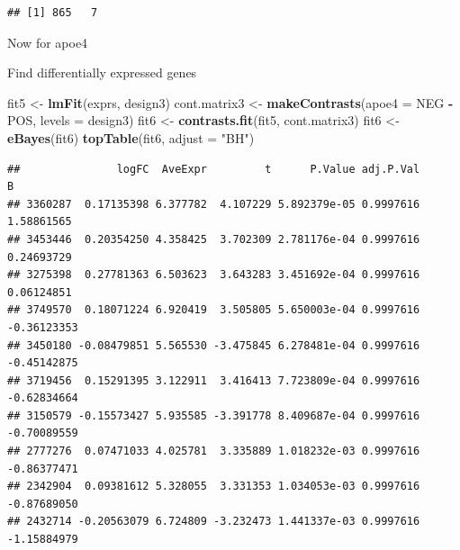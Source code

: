 \documentclass[]{article}
\newenvironment{Shaded}{\begin{snugshade}}{\end{snugshade}}
\newcommand{\KeywordTok}[1]{\textcolor[rgb]{0.13,0.29,0.53}{\textbf{#1}}}
\newcommand{\DataTypeTok}[1]{\textcolor[rgb]{0.13,0.29,0.53}{#1}}
\newcommand{\DecValTok}[1]{\textcolor[rgb]{0.00,0.00,0.81}{#1}}
\newcommand{\StringTok}[1]{\textcolor[rgb]{0.31,0.60,0.02}{#1}}
\newcommand{\OperatorTok}[1]{\textcolor[rgb]{0.81,0.36,0.00}{\textbf{#1}}}
\newcommand{\NormalTok}[1]{#1}
\begin{document}
\begin{verbatim}
## [1] 865   7
\end{verbatim}

Now for apoe4

\begin{Shaded}
\end{Shaded}

Find differentially expressed genes

\begin{Shaded}
\begin{Highlighting}[]
\NormalTok{fit5 <-}\StringTok{ }\KeywordTok{lmFit}\NormalTok{(exprs, design3)}
\NormalTok{cont.matrix3 <-}\StringTok{ }\KeywordTok{makeContrasts}\NormalTok{(}\DataTypeTok{apoe4 =}\NormalTok{ NEG }\OperatorTok{-}\StringTok{ }\NormalTok{POS, }\DataTypeTok{levels =}\NormalTok{ design3)}
\NormalTok{fit6 <-}\StringTok{ }\KeywordTok{contrasts.fit}\NormalTok{(fit5, cont.matrix3)}
\NormalTok{fit6 <-}\StringTok{ }\KeywordTok{eBayes}\NormalTok{(fit6)}
\KeywordTok{topTable}\NormalTok{(fit6, }\DataTypeTok{adjust =} \StringTok{"BH"}\NormalTok{)}
\end{Highlighting}
\end{Shaded}

\begin{verbatim}
##               logFC  AveExpr         t      P.Value adj.P.Val           B
## 3360287  0.17135398 6.377782  4.107229 5.892379e-05 0.9997616  1.58861565
## 3453446  0.20354250 4.358425  3.702309 2.781176e-04 0.9997616  0.24693729
## 3275398  0.27781363 6.503623  3.643283 3.451692e-04 0.9997616  0.06124851
## 3749570  0.18071224 6.920419  3.505805 5.650003e-04 0.9997616 -0.36123353
## 3450180 -0.08479851 5.565530 -3.475845 6.278481e-04 0.9997616 -0.45142875
## 3719456  0.15291395 3.122911  3.416413 7.723809e-04 0.9997616 -0.62834664
## 3150579 -0.15573427 5.935585 -3.391778 8.409687e-04 0.9997616 -0.70089559
## 2777276  0.07471033 4.025781  3.335889 1.018232e-03 0.9997616 -0.86377471
## 2342904  0.09381612 5.328055  3.331353 1.034053e-03 0.9997616 -0.87689050
## 2432714 -0.20563079 6.724809 -3.232473 1.441337e-03 0.9997616 -1.15884979
\end{verbatim}
\end{document}
